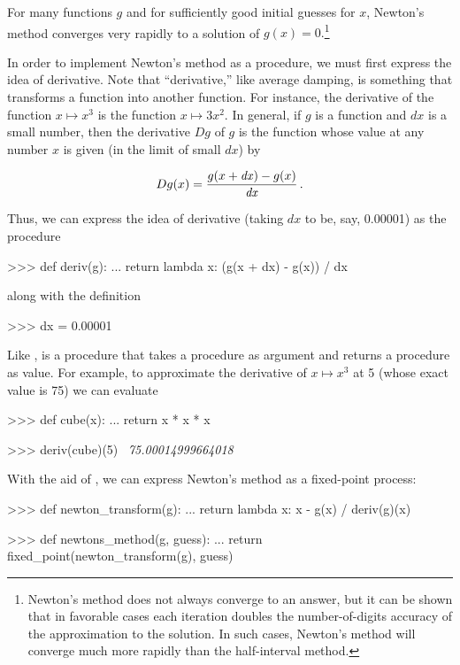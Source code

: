 For many functions \( g \) and for sufficiently good initial guesses for \( x \),
Newton's method converges very rapidly to a solution of \( g(x) = 0. \)\footnote{Newton's method does not always converge to an answer, but it can
be shown that in favorable cases each iteration doubles the number-of-digits
accuracy of the approximation to the solution.  In such cases, Newton's method
will converge much more rapidly than the half-interval method.}

In order to implement Newton's method as a procedure, we must first express the
idea of derivative.  Note that ``derivative,'' like average damping, is
something that transforms a function into another function.  For instance, the
derivative of the function \( x \mapsto x^3 \) is the function \( x \mapsto 3x^2\!. \)
In general, if \( g \) is a function and \( dx \) is a small number,
then the derivative \( Dg \) of \( g \) is the function whose value at any
number \( x \) is given (in the limit of small \( dx \)) by

$$ {Dg(x)} = \frac{g(x + {\it dx}) - g(x)}{{\it dx}}\,. $$

\noindent
Thus, we can express the idea of derivative (taking \( dx \) to be, say,
0.00001) as the procedure

\begin{codeBlock}
>>> def deriv(g):
...     return lambda x: (g(x + dx) - g(x)) / dx
\end{codeBlock}

\noindent
along with the definition

\begin{codeBlock}
>>> dx = 0.00001
\end{codeBlock}

\noindent
Like ,  is a procedure that takes a procedure as
argument and returns a procedure as value.  For example, to approximate the
derivative of \( x \mapsto x^3 \) at 5 (whose exact value is 75) we can evaluate

\begin{codeBlock}
>>> def cube(x):
...     return x * x * x

>>> deriv(cube)(5)
~\textit{75.00014999664018}~
\end{codeBlock}

\noindent
With the aid of , we can express Newton's method as a fixed-point
process:

\begin{codeBlock}
>>> def newton_transform(g):
...     return lambda x: x - g(x) / deriv(g)(x)

>>> def newtons_method(g, guess):
...     return fixed_point(newton_transform(g), guess)
\end{codeBlock}

